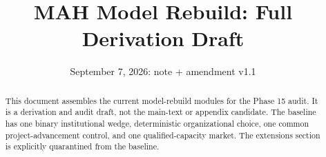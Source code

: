 \documentclass[11pt]{article}
\title{MAH Model Rebuild: Full Derivation Draft}
\author{}
\date{September 7, 2026: note + amendment v1.1}
\begin{document}
\maketitle

\begin{abstract}
This document assembles the current model-rebuild modules for the Phase 15 audit.
It is a derivation and audit draft, not the main-text or appendix candidate.
The baseline has one binary institutional wedge, deterministic organizational
choice, one common project-advancement control, and one qualified-capacity
market. The extensions section is explicitly quarantined from the baseline.
\end{abstract}

\tableofcontents













\end{document}
